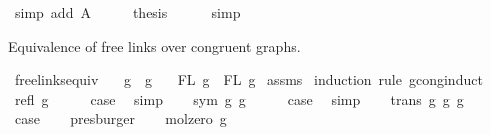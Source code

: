 \begin{isabellebody}
\ {\isacharparenleft}{\kern0pt}simp\ add{\isacharcolon}{\kern0pt}\ A{}{\isacharparenright}{\kern0pt}\isanewline
\ \ \isamarkupfalse%
\ \isamarkupfalse%
\ {\isacharquery}{\kern0pt}thesis\isanewline
\ \ \ \ \isamarkupfalse%
\ simp\isanewline
{}\isamarkupfalse%
%
\endisatagproof
{\isafoldproof}%
%
\isadelimproof
%
\endisadelimproof
%
\begin{isamarkuptext}%
Equivalence of free links over congruent graphs.%
\end{isamarkuptext}\isamarkuptrue%
\isamarkupfalse%
\ freelinks{\isacharunderscore}{\kern0pt}equiv{\isacharcolon}{\kern0pt}\isanewline
\ \ \ {\isachardoublequoteopen}g{}\ {\isasymsimeq}\ g{}{\isachardoublequoteclose}\isanewline
\ \ \ {\isachardoublequoteopen}FL\ g{}\ {\isacharequal}{\kern0pt}\ FL\ g{}{\isachardoublequoteclose}\isanewline
%
\isadelimproof
%
\endisadelimproof
%
\isatagproof
{}\isamarkupfalse%
\ assms\isanewline
{}\isamarkupfalse%
\ {\isacharparenleft}{\kern0pt}induction\ rule{\isacharcolon}{\kern0pt}\ gcong{\isachardot}{\kern0pt}induct{\isacharparenright}{\kern0pt}\isanewline
\ \ \isamarkupfalse%
\ {\isacharparenleft}{\kern0pt}refl\ g{\isacharparenright}{\kern0pt}\isanewline
\ \ \isamarkupfalse%
\ \isamarkupfalse%
\ {\isacharquery}{\kern0pt}case\ \isamarkupfalse%
\ simp\isanewline
{}\isamarkupfalse%
\isanewline
\ \ \isamarkupfalse%
\ {\isacharparenleft}{\kern0pt}sym\ g{}\ g{}{\isacharparenright}{\kern0pt}\isanewline
\ \ \isamarkupfalse%
\ \isamarkupfalse%
\ {\isacharquery}{\kern0pt}case\ \isamarkupfalse%
\ simp\isanewline
{}\isamarkupfalse%
\isanewline
\ \ \isamarkupfalse%
\ {\isacharparenleft}{\kern0pt}trans\ g{}\ g{}\ g{}{\isacharparenright}{\kern0pt}\isanewline
\ \ \isamarkupfalse%
\ \isamarkupfalse%
\ {\isacharquery}{\kern0pt}case\isanewline
\ \ \isamarkupfalse%
\ presburger\isanewline
{}\isamarkupfalse%
\isanewline
\ \ \isamarkupfalse%
\ {\isacharparenleft}{\kern0pt}mol{\isacharunderscore}{\kern0pt}zero\ g{\isacharparenright}{\kern0pt}\isanewline

\end{isabellebody}
